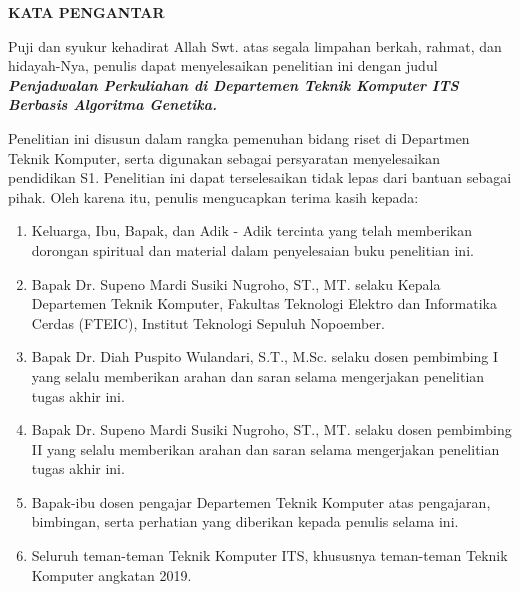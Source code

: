 \begin{center}
  \Large
  \textbf{KATA PENGANTAR}
\end{center}


\vspace{2ex}


Puji dan syukur kehadirat Allah Swt. atas segala limpahan berkah, rahmat, dan hidayah-Nya, penulis dapat menyelesaikan penelitian
ini dengan judul \emph{\textbf{Penjadwalan Perkuliahan di Departemen Teknik Komputer ITS Berbasis Algoritma Genetika.}}

Penelitian ini disusun dalam rangka pemenuhan bidang riset di
Departmen Teknik Komputer, serta digunakan sebagai persyaratan
menyelesaikan pendidikan S1. Penelitian ini dapat terselesaikan
tidak lepas dari bantuan sebagai pihak.
Oleh karena itu, penulis mengucapkan terima kasih kepada:

\begin{enumerate}[nolistsep]

  \item Keluarga, Ibu, Bapak, dan Adik - Adik tercinta yang telah
  memberikan dorongan spiritual dan material dalam penyelesaian buku penelitian ini.

  \item Bapak Dr. Supeno Mardi Susiki Nugroho, ST., MT. selaku Kepala Departemen Teknik Komputer, Fakultas Teknologi
  Elektro dan Informatika Cerdas (FTEIC), Institut Teknologi
  Sepuluh Nopoember.

  \item Bapak Dr. Diah Puspito Wulandari, S.T., M.Sc. selaku dosen pembimbing I yang selalu memberikan arahan dan saran
  selama mengerjakan penelitian tugas akhir ini.

  \item Bapak Dr. Supeno Mardi Susiki Nugroho, ST., MT. selaku dosen pembimbing II yang selalu memberikan arahan dan
  saran selama mengerjakan penelitian tugas akhir ini.

  \item Bapak-ibu dosen pengajar Departemen Teknik Komputer atas
  pengajaran, bimbingan, serta perhatian yang diberikan kepada penulis selama ini.

  \item Seluruh teman-teman Teknik Komputer ITS, khususnya teman-teman Teknik Komputer angkatan 2019. 

\end{enumerate}

